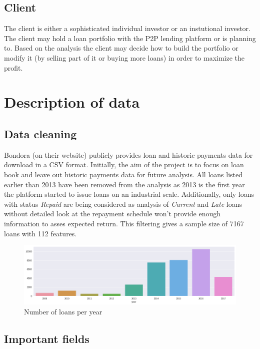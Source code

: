 \documentclass[preprint,12pt]{elsarticle}
\begin{document}
\subsection{Client}

The client is either a sophisticated individual investor or an instutional investor. The client may hold a loan portfolio with the P2P lending platform or is planning to. Based on the analysis the client may decide how to build the portfolio or modify it (by selling part of it or buying more loans) in order to maximize the profit.

\section{Description of data}
\label{S:2}

\subsection{Data cleaning}
Bondora (on their website) publicly provides loan and historic payments data for download in a CSV format. Initially, the aim of the project is to focus on loan book and leave out historic payments data for future analysis. All loans listed earlier than 2013 have been removed from the analysis as 2013 is the first year the platform started to issue loans on an industrial scale. Additionally, only loans with status \textit{Repaid} are being considered as analysis of \textit{Current} and \textit{Late} loans without detailed look at the repayment schedule won't provide enough information to asses expected return. This filtering gives a sample size of 7167 loans with 112 features.

\begin{figure}[h]
\centering\includegraphics[width=1.0\linewidth]{plots/loans_per_year}
\caption{Number of loans per year}
\end{figure}

\subsection{Important fields}
\end{document}
